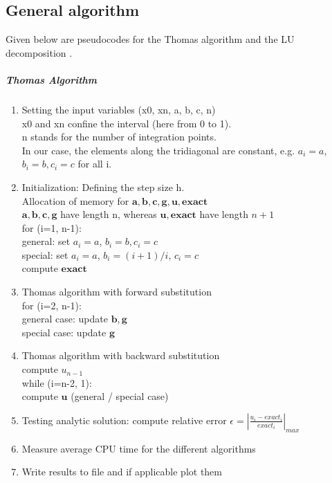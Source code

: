 \documentclass[%
oneside,                 %
final,                   %
10pt]{article}
\begin{document}
\subsection*{General algorithm} 
Given below are pseudocodes for the Thomas algorithm and the LU decomposition \cite{CodeExamples}.
\subparagraph{Thomas Algorithm}
\begin{enumerate}
\item Setting the input variables (x0, xn, a, b, c, n) \\
	x0 and xn confine the interval (here from 0 to 1). \\
	n stands for the number of integration points. \\
	In our case, the elements along the tridiagonal are constant, e.g. $a_i=a$, $b_i=b, c_i=c$ for all i. 
	
\item Initialization: Defining the step size h. \\
	Allocation of memory for $ \mathbf{a}, \mathbf{b}, \mathbf{c}, \mathbf{g}, \mathbf{u}, \mathbf{exact}$\\
	 $ \mathbf{a}, \mathbf{b}, \mathbf{c}, \mathbf{g}$ have length n, whereas $\mathbf{u}, \mathbf{exact}$ have length $n+1$\\
	for (i=1, n-1): \\
		 general: set $a_i=a$, $b_i=b, c_i=c$ \\
		 special: set $a_i=a$, $b_i=(i+1)/i$, $c_i=c$ \\
		 compute $\mathbf{exact}$  

\item Thomas algorithm with forward substitution\\
	 for (i=2, n-1):\\
	general case: update $\mathbf{b}, \mathbf{g}$ \\
	special case: update $\mathbf{g}$

\item Thomas algorithm with backward substitution \\
	compute $u_{n-1}$\\
	 while (i=n-2, 1):\\ 
	 compute $\mathbf{u}$ (general / special case)

\item Testing analytic solution: compute relative error $  \epsilon =  \left\lvert \frac{u_i-exact_i}{exact_i} \right\rvert_{max}$ 

\item Measure average CPU time for the different algorithms

\item Write results to file and if applicable plot them
\end{enumerate}
\end{document}
